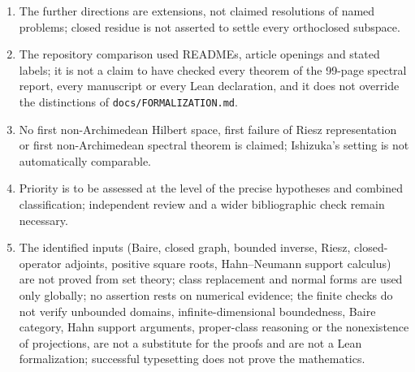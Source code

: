 \documentclass[11pt,letterpaper]{article}
\numberwithin{equation}{section}
\theoremstyle{definition}
\theoremstyle{remark}
\newcommand{\fn}[1]{\nolinkurl{#1}}
\begin{document}
\begin{enumerate}[leftmargin=*,widest=00,label=06.\arabic*]
\item The further directions are extensions, not claimed resolutions of named
problems; closed residue is not asserted to settle every orthoclosed
subspace.
\item The repository comparison used READMEs, article openings and stated
labels; it is not a claim to have checked every theorem of the 99-page
spectral report, every manuscript or every Lean declaration, and it does not
override the distinctions of \fn{docs/FORMALIZATION.md}.
\item No first non-Archimedean Hilbert space, first failure of Riesz
representation or first non-Archimedean spectral theorem is claimed;
Ishizuka's setting is not automatically comparable.
\item Priority is to be assessed at the level of the precise hypotheses and
combined classification; independent review and a wider bibliographic check
remain necessary.
\item The identified inputs (Baire, closed graph, bounded inverse, Riesz,
closed-operator adjoints, positive square roots, Hahn--Neumann support
calculus) are not proved from set theory; class replacement and normal forms
are used only globally; no assertion rests on numerical evidence; the finite
checks do not verify unbounded domains, infinite-dimensional boundedness,
Baire category, Hahn support arguments, proper-class reasoning or the
nonexistence of projections, are not a substitute for the proofs and are not
a Lean formalization; successful typesetting does not prove the mathematics.
\end{enumerate}
\end{document}

